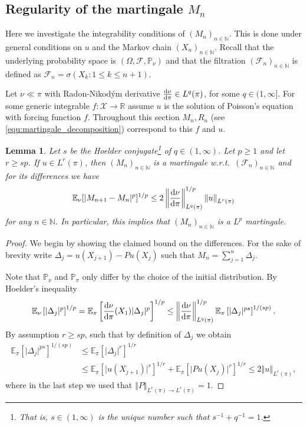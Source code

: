 \documentclass[12pt]{article}
\theoremstyle{plain}
\newtheorem{lem}[thm]{Lemma}
\renewcommand{\d}{{\rm d}}
\newcommand{\norm}[1]{\left\Vert #1 \right\Vert}
\newcommand{\N}{\mathbb{N}}
\newcommand{\E}{\mathbb{E}}
\newcommand{\R}{\mathbb{R}}
\newcommand{\cX}{\mathcal{X}}
\begin{document}
{\subsection{Regularity of the martingale $M_n$}
Here we investigate the integrability conditions of $(M_n)_{n \in \N}$.
This is done under general conditions on $u$ and the Markov chain $(X_n)_{n \in \N}$. 
Recall that the underlying probability space is $(\Omega, \mathcal{F}, \mathbb{P}_\nu)$ and that
the filtration $(\mathcal{F}_n)_{n \in \N}$ is defined as $\mathcal{F}_n = \sigma(X_k \colon 1\leq k \leq n+1)$.

Let $\nu \ll \pi$ with Radon-Nikod\'ym derivative $\frac{\d \nu}{\d \pi} \in L^q(\pi)$, for some $q \in (1,\infty]$.
For some generic integrable $f \colon \cX \to \R$ assume $u$ is the solution of Poisson's equation with forcing function $f$. 
Throughout this section $M_n, R_n$ (see \eqref{equ:martingale_decomposition}) correspond to this $f$ and $u$. 

\begin{lem}\label{lem:martingale_bound_1}
Let $s$ be the Hoelder conjugate\footnote{That is, $s \in (1, \infty)$ is the unique number such that $s^{-1} + q^{-1} =1$.} of $q \in (1, \infty)$.
Let $p\geq 1$ and let $r \geq sp$. If $u \in L^{r}(\pi)$, then $(M_n)_{n \in \N}$ is a martingale w.r.t.~$(\mathcal{F}_n)_{n \in \N}$ and for its differences we have
\[
\E_\nu[ \vert M_{n+1} - M_n \vert^p ]^{1/p} \leq 2\norm{\frac{\d \nu}{\d \pi}}_{L^q(\pi)}^{1/p} \norm{u}_{L^r(\pi)}
\]
for any $n \in \N$.
In particular, this implies that $(M_n)_{n \in \N}$ is a $L^p$ martingale. 
\end{lem}

\begin{proof}
We begin by showing the claimed bound on the differences. 
For the sake of brevity write $\Delta_j = u(X_{j+1}) -Pu(X_j) $ such that $M_n = \sum_{j=1}^n \Delta_j$. 

Note that $\mathbb{P}_\nu$ and $\mathbb{P}_\pi$ only differ by the choice of the initial distribution. 
By Hoelder's inequality
\begin{align*}
\E_\nu\left[\vert \Delta_j\vert^p\right]^{1/p} = \E_\pi\left[ \frac{\d \nu}{\d \pi}(X_1) \vert \Delta_j\vert^p\right]^{1/p} 
\leq\norm{\frac{\d \nu}{\d \pi}}_{L^q(\pi)}^{1/p} \E_\pi\left[  \vert \Delta_j\vert^{ps}\right]^{1/(sp)}.
\end{align*}
By assumption $r\geq sp$, such that by definition of $\Delta_j$ we obtain
\begin{align*}
\E_\pi\left[  \vert \Delta_j\vert^{ps}\right]^{1/(sp)}&\leq 
\E_\pi\left[  \vert \Delta_j\vert^{r}\right]^{1/r}\\ 
&\leq 
\E_\pi\left[\vert u(X_{j+1}) \vert^r \right]^{1/r} + \E_\pi\left[\vert Pu(X_{j}) \vert^r \right]^{1/r} 
\leq 2 \norm{u}_{L^r(\pi)},
\end{align*}
where in the last step we used that $\norm{P}_{L^r(\pi) \to L^r(\pi)} =1$. 


\end{proof}}
\end{document}
